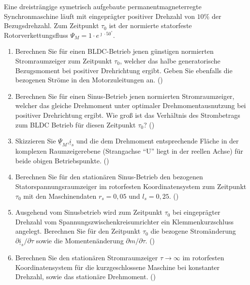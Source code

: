 \begin{question}[topic=psm,name={3.12.2013},type=exam,tags={20131203}]
Eine dreisträngige symetrisch aufgebaute permanentmagneterregte Synchronmaschine läuft mit eingeprägter positiver Drehzahl von $10\%$ der Bezugsdrehzahl. Zum Zeitpunkt $\tau_0$ ist der normierte statorfeste Rotorverkettungsfluss $\Psi_M = 1 \cdot e^{\jmath \cdot 50 ^\circ}$.
\begin{enumerate}
\item Berechnen Sie für einen BLDC-Betrieb jenen günstigen normierten Stromraumzeiger zum Zeitpunkt $\tau_0$, welcher das halbe generatorische Bezugsmoment bei positiver Drehrichtung ergibt. Geben Sie ebenfalls die bezogenen Ströme in den Motorzuleitungen an. ()
\item Berechnen Sie für einen Sinus-Betrieb jenen normierten Stromraumzeiger, welcher das gleiche Drehmoment unter optimaler Drehmomentausnutzung bei positiver Drehrichtung ergibt. Wie groß ist das Verhältnis des Strombetrags zum BLDC Betrieb für diesen Zeitpunkt $\tau_0$? ()
\item Skizzieren Sie $\underline{\Psi}_M$,$\underline{i}_s$ und die dem Drehmoment entsprechende Fläche in der komplexen Raumzeigerebene (Strangachse "`U"' liegt in der reellen Achse) für beide obigen Betriebspunkte. ()
\item Berechnen Sie für den stationären Sinus-Betrieb den bezogenen Statorspannungsraumzeiger im rotorfesten Koordinatensystem zum Zeitpunkt $\tau_0$ mit den Maschinendaten $r_s = 0,05$ und $l_s = 0,25$. ()
\item Ausgehend vom Sinusbetrieb wird zum Zeitpunkt $\tau_0$ bei eingeprägter Drehzahl vom Spannungszwischenkreisumrichter ein Klemmenkurzschluss angelegt. Berechnen Sie für den Zeitpunkt $\tau_0$ die bezogene Stromänderung $\partial \underline{i}_s/\partial \tau$ sowie die Momentenänderung $\partial m/\partial \tau$. ()
\item Berechnen Sie den stationären Stromraumzeiger $ \tau \rightarrow \infty$ im rotorfesten Koordinatensystem für die kurzgeschlossene Maschine bei konstanter Drehzahl, sowie das stationäre Drehmoment. ()
\end{enumerate}
\end{question}
